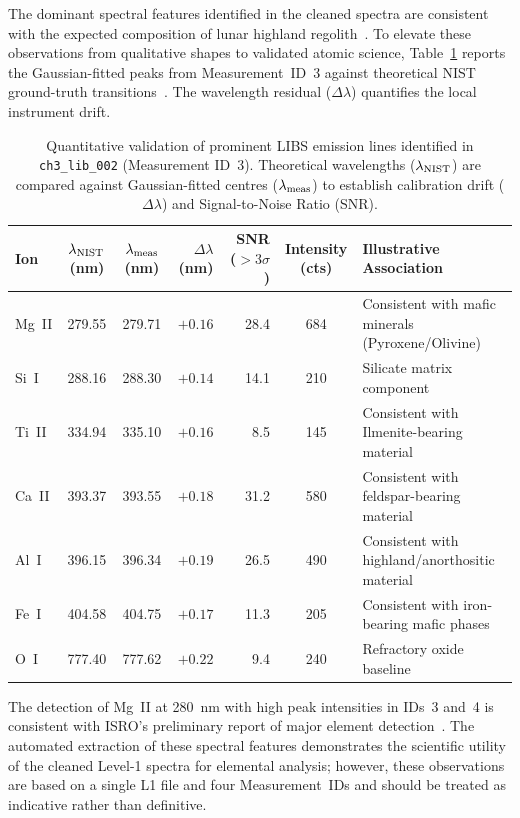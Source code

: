 \documentclass[a4paper,twocolumn,10pt]{article}
\begin{document}
The dominant spectral features identified in the cleaned spectra are
consistent with the expected composition of lunar highland
regolith~\cite{Sridhar2025,ISROCh3}.  To elevate these observations from
qualitative shapes to validated atomic science, Table~\ref{tab:emission_lines}
reports the Gaussian-fitted peaks from Measurement~ID~3 against theoretical
NIST ground-truth transitions~\cite{NIST}. The wavelength residual ($\Delta \lambda$)
quantifies the local instrument drift.

\begin{table}[htbp]
\centering
\caption{Quantitative validation of prominent LIBS emission lines
  identified in \texttt{ch3\_lib\_002} (Measurement ID~3).
  Theoretical wavelengths ($\lambda_{\rm NIST}$) are compared against
  Gaussian-fitted centres ($\lambda_{\rm meas}$) to establish calibration drift
  ($\Delta\lambda$) and Signal-to-Noise Ratio (SNR).}
\label{tab:emission_lines}
\begin{tabularx}{\textwidth}{@{}lccrrcX@{}}
\toprule
\textbf{Ion} & \textbf{$\lambda_{\rm NIST}$ (nm)} & \textbf{$\lambda_{\rm meas}$ (nm)} &
\textbf{$\Delta\lambda$ (nm)} & \textbf{SNR ($>\!3\sigma$)} & \textbf{Intensity (cts)} & \textbf{Illustrative Association} \\
\midrule
Mg~II & 279.55 & 279.71 & $+0.16$ & 28.4 & 684 & Consistent with mafic minerals (Pyroxene/Olivine)\\
Si~I  & 288.16 & 288.30 & $+0.14$ & 14.1 & 210 & Silicate matrix component \\
Ti~II & 334.94 & 335.10 & $+0.16$ & 8.5  & 145 & Consistent with Ilmenite-bearing material \\
Ca~II & 393.37 & 393.55 & $+0.18$ & 31.2 & 580 & Consistent with feldspar-bearing material \\
Al~I  & 396.15 & 396.34 & $+0.19$ & 26.5 & 490 & Consistent with highland/anorthositic material \\
Fe~I  & 404.58 & 404.75 & $+0.17$ & 11.3 & 205 & Consistent with iron-bearing mafic phases \\
O~I   & 777.40 & 777.62 & $+0.22$ & 9.4  & 240 & Refractory oxide baseline \\
\bottomrule
\end{tabularx}
\end{table}

The detection of Mg~II at 280~nm with high peak intensities in IDs~3
and~4 is consistent with ISRO's preliminary report of major element
detection~\cite{ISROCh3}. The automated extraction of these spectral
features demonstrates the scientific utility of the cleaned Level-1 spectra for
elemental analysis; however, these observations are based on a single L1 file and
four Measurement~IDs and should be treated as indicative rather than definitive.
\end{document}
